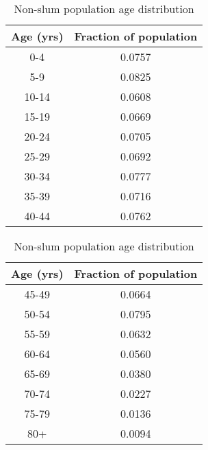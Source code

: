 \documentclass{article}
\theoremstyle{definition}
\begin{document}
  
  \begin{table}
  \centering
    \small
    \caption{Non-slum population age distribution \label{non slum age}}
    \begin{tabular}{|c|c|}
      \hline
      {\bf Age (yrs)} & {\bf Fraction of population}\\
      \hline
      0-4 & 0.0757\\
      5-9 & 0.0825 \\ 
      10-14 & 0.0608\\
      15-19 & 0.0669 \\ 
      20-24 & 0.0705\\
      25-29 & 0.0692 \\ 
      30-34 & 0.0777\\
      35-39 & 0.0716 \\ 
      40-44 & 0.0762\\
      \hline
    \end{tabular}
    \quad
     \begin{tabular}{|c|c|}
      \hline
      {\bf Age (yrs)} & {\bf Fraction of population}\\
      \hline
      45-49 & 0.0664 \\ 
      50-54 & 0.0795\\
      55-59 & 0.0632 \\ 
      60-64 & 0.0560\\
      65-69 & 0.0380 \\ 
      70-74 & 0.0227\\
      75-79 & 0.0136 \\
      80+ & 0.0094\\
      \hline
    \end{tabular}
\end{table}


    
  
\end{document}
